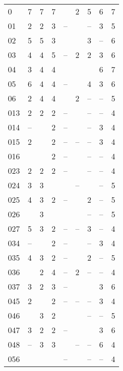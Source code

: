 \begin{center}
\label{tab:appendix-transpositions}
\begin{supertabular}{l c c c c c c c c}
0    & 7 & 7 & 7 &  & 2 & 5 & 6 & 7 \\

01   & 2 & 2 & 3 & -- &  & -- & 3 & 5 \\
02   & 5 & 5 & 3 &  &  & 3 & -- & 6 \\
03   & 4 & 4 & 5 & -- & 2 & 2 & 3 & 6 \\
04   & 3 & 4 & 4 &  &  &  & 6 & 7 \\
05   & 6 & 4 & 4 & -- &  & 4 & 3 & 6 \\
06   & 2 & 4 & 4 &  & 2 & -- & -- & 5 \\

013  & 2 & 2 & 2 & -- &  & -- & -- & 4 \\
014  & -- &  & 2 & -- &  & -- & 3 & 4 \\
015  & 2 &  & 2 & -- & -- & -- & 3 & 4 \\
016  &  &  & 2 & -- &  & -- & -- & 4 \\
023  & 2 & 2 & 2 & -- &  & -- & -- & 4 \\
024  & 3 & 3 &  &  & -- &  & -- & 5 \\
025  & 4 & 3 & 2 & -- &  & 2 & -- & 5 \\
026  &  & 3 &  &  &  & -- & -- & 5 \\
027  & 5 & 3 & 2 & -- & -- & 3 & -- & 4 \\
034  & -- &  & 2 & -- &  & -- & 3 & 4 \\
035  & 4 & 3 & 2 & -- &  & 2 & -- & 5 \\
036  &  & 2 & 4 & -- & 2 & -- & -- & 4 \\
037  & 3 & 2 & 3 & -- &  &  & 3 & 6 \\
045  & 2 &  & 2 & -- & -- & -- & 3 & 4 \\
046  &  & 3 & 2 &  &  & -- & -- & 5 \\
047  & 3 & 2 & 2 & -- &  &  & 3 & 6 \\
048  & -- & 3 & 3 &  & -- & -- & 6 & 4 \\
056  &  &  &  & -- &  & -- & -- & 4 \\


\end{supertabular}
\end{center}
